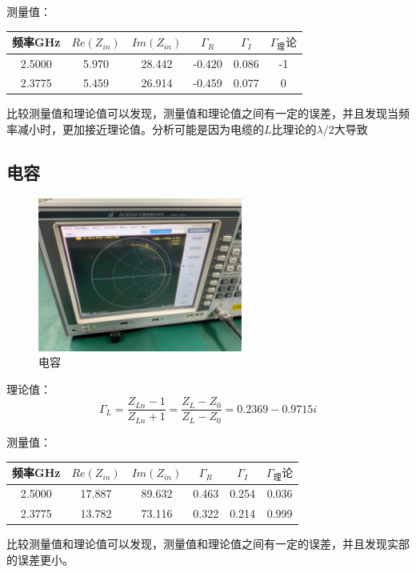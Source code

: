 \documentclass{../source/Experiment}
\begin{document}
测量值：
\begin{table}[H]
    \centering
    \begin{tabular}{|c|c|c|c|c|c|}
        \hline
        频率GHz & $Re(Z_{in})$ & $Im(Z_{in})$ & $\Gamma _R$ & $\Gamma _I$ & $\Gamma _理论$ \\ \hline
        2.5000  & 5.970        & 28.442       & -0.420      & 0.086       & -1             \\ \hline
        2.3775  & 5.459        & 26.914       & -0.459      & 0.077       & 0              \\ \hline
    \end{tabular}
\end{table}

比较测量值和理论值可以发现，测量值和理论值之间有一定的误差，并且发现当频率减小时，更加接近理论值。分析可能是因为电缆的$L$比理论的$\lambda /2$大导致

\subsection{电容}
\begin{figure}[H]
    \centering
    \includegraphics[width = 0.6\textwidth]{pic/L2}
    \caption{电容}
\end{figure}
理论值：$$\Gamma _L = \frac{Z_{Ln}-1}{Z_{Ln}+1} = \frac{Z_L - Z_0}{Z_L - Z_0} = 0.2369 −
    0.9715i$$

测量值：
\begin{table}[H]
    \centering
    \begin{tabular}{|c|c|c|c|c|c|}
        \hline
        频率GHz & $Re(Z_{in})$ & $Im(Z_{in})$ & $\Gamma _R$ & $\Gamma _I$ & $\Gamma _理论$ \\ \hline
        2.5000  & 17.887       & 89.632       & 0.463       & 0.254       & 0.036          \\ \hline
        2.3775  & 13.782       & 73.116       & 0.322       & 0.214       & 0.999          \\ \hline
    \end{tabular}
\end{table}
比较测量值和理论值可以发现，测量值和理论值之间有一定的误差，并且发现实部的误差更小。
\end{document}
